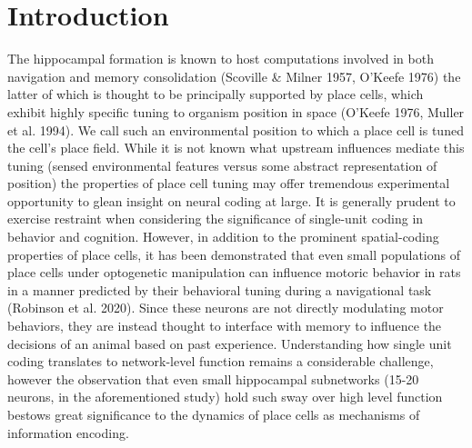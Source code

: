 \documentclass[12pt, letterpaper]{article}
\newenvironment{collapsable}{}{}
\begin{document}
\begin{collapsable}
  \section*{\normalfont\normalsize\bf Introduction}
  The hippocampal formation is known to host computations involved in both
  navigation and memory consolidation (Scoville \& Milner 1957, O'Keefe 1976)
  the latter of which is thought to be principally supported by place cells, which exhibit
  highly specific tuning to organism position in space (O'Keefe 1976, Muller et
  al. 1994). We call such an environmental
  position to which a place cell is tuned the cell's place field. While it is not known what
  upstream influences mediate this tuning (sensed environmental features versus some
  abstract representation of position) the properties of place cell tuning may offer
  tremendous experimental opportunity to glean insight on neural coding at large.
  It is generally prudent to exercise restraint when considering the
  significance of single-unit coding in behavior and cognition. However, in
  addition to the prominent spatial-coding properties of place cells, it has been demonstrated that
  even small populations of place cells under optogenetic manipulation can
  influence motoric behavior in rats in a manner predicted by their behavioral
  tuning during a navigational task (Robinson et al. 2020). Since these neurons are not directly
  modulating motor behaviors, they are instead thought to interface with memory to
  influence the decisions of an animal based on past experience. Understanding
  how single unit coding translates to network-level function remains a
  considerable challenge, however the observation that even small hippocampal
  subnetworks (15-20 neurons, in the aforementioned study) hold such sway over
  high level function bestows great significance to the dynamics of place cells
  as mechanisms of information encoding.

  \vspace{12pt}


\end{collapsable}
\end{document}
